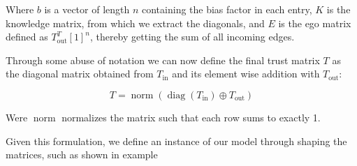 Where $b$ is a vector of length $n$ containing the bias factor in each entry,
$K$ is the knowledge matrix, from which we extract the diagonals, and $E$ is
the ego matrix defined as $T_{\text{out}}^T [1]^n$, thereby getting the sum of
all incoming edges.

Through some abuse of notation we can now define the final trust matrix $T$ as the diagonal matrix obtained from $T_{\text{in}}$ and its element wise addition with $T_{\text{out}}$:

\begin{equation}
	T = \operatorname{norm}\left(\operatorname{diag}(T_{\text{in}}) \oplus T_{\text{out}}\right)
	\label{eq:final_trust}
\end{equation}

Were $\operatorname{norm}$ normalizes the matrix such that each row sums to exactly 1.


Given this formulation, we define an instance of our model through shaping the matrices, such as shown in example

